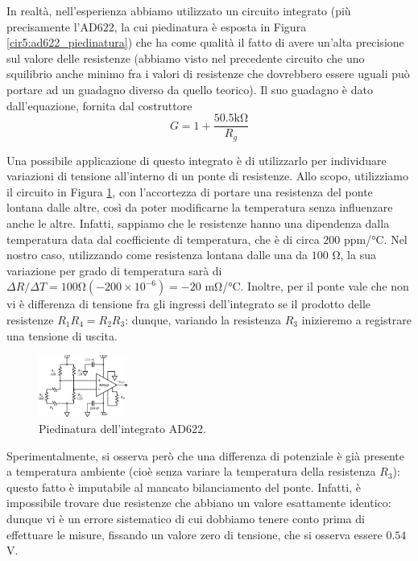 In realtà, nell'esperienza abbiamo utilizzato un circuito integrato (più precisamente l'AD622, la cui piedinatura è esposta in Figura \ref{cir5:ad622_piedinatura}) che ha come qualità il fatto di avere un'alta precisione sul valore delle resistenze (abbiamo visto nel precedente circuito che uno squilibrio anche minimo fra i valori di resistenze che dovrebbero essere uguali può portare ad un guadagno diverso da quello teorico). Il suo guadagno è dato dall'equazione, fornita dal costruttore
$$G=1+\frac{50.5 \si{\kilo\ohm}}{R_g}$$

Una possibile applicazione di questo integrato è di utilizzarlo per individuare variazioni di tensione all'interno di un ponte di resistenze. Allo scopo, utilizziamo il circuito in Figura \ref{cir5:ad622_ponte}, con l'accortezza di portare una resistenza del ponte lontana dalle altre, così da poter modificarne la temperatura senza influenzare anche le altre. Infatti, sappiamo che le resistenze hanno una dipendenza dalla temperatura data dal coefficiente di temperatura, che è di circa $200$ ppm/\si{\celsius}. Nel nostro caso, utilizzando come resistenza lontana dalle una da $100$ \si{\ohm}, la sua variazione per grado di temperatura sarà di $\Delta R / \Delta T= 100 \si{\ohm} (-200 \times 10^{-6}) = -20$ \si{\milli\ohm/\celsius}. Inoltre, per il ponte vale che non vi è differenza di tensione fra gli ingressi dell'integrato se il prodotto delle resistenze $R_1 R_4=R_2 R_3$: dunque, variando la resistenza $R_3$ inizieremo a registrare una tensione di uscita.

\begin{figure}
  \begin{center}
    \includegraphics[width=0.260\textwidth]{../E05/latex/c_func_INA.pdf}
  \end{center}
  \caption{Piedinatura dell'integrato AD622.}
  \label{cir5:ad622_ponte}
\end{figure}

Sperimentalmente, si osserva però che una differenza di potenziale è già presente a temperatura ambiente (cioè senza variare la temperatura della resistenza $R_3$): questo fatto è imputabile al mancato bilanciamento del ponte. Infatti, è impossibile trovare due resistenze che abbiano un valore esattamente identico: dunque vi è un errore sistematico di cui dobbiamo tenere conto prima di effettuare le misure, fissando un valore zero di tensione, che si osserva essere $0.54$\si{\volt}.

